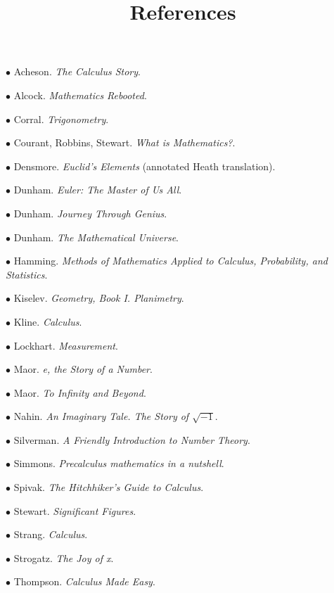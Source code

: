 \documentclass[11pt, oneside]{article}   	%
\title{References}
\date{}
\begin{document}
\maketitle
\Large

$\bullet$ Acheson.  \emph{The Calculus Story}.

$\bullet$ Alcock. \emph{Mathematics Rebooted}.

$\bullet$ Corral. \emph{Trigonometry}.

$\bullet$ Courant, Robbins, Stewart. \emph{What is Mathematics?}.

$\bullet$ Densmore. \emph{Euclid's Elements} (annotated Heath translation).

$\bullet$ Dunham. \emph{Euler:  The Master of Us All}.

$\bullet$ Dunham. \emph{Journey Through Genius}.

$\bullet$ Dunham. \emph{The Mathematical Universe}.

$\bullet$ Hamming.  \emph{Methods of Mathematics Applied to Calculus, Probability, and Statistics}.

$\bullet$ Kiselev. \emph{Geometry, Book I. Planimetry}.

$\bullet$ Kline. \emph{Calculus}.

$\bullet$ Lockhart. \emph{Measurement}.

$\bullet$ Maor. \emph{e, the Story of a Number}.

$\bullet$ Maor. \emph{To Infinity and Beyond}.

$\bullet$ Nahin. \emph{An Imaginary Tale.  The Story of $\sqrt{-1}$}.

$\bullet$ Silverman.  \emph{A Friendly Introduction to Number Theory}.

$\bullet$ Simmons.  \emph{Precalculus mathematics in a nutshell}.

$\bullet$ Spivak.  \emph{The Hitchhiker's Guide to Calculus}.

$\bullet$ Stewart.  \emph{Significant Figures}.

$\bullet$ Strang.  \emph{Calculus}.

$\bullet$ Strogatz.  \emph{The Joy of x}.

$\bullet$ Thompson.  \emph{Calculus Made Easy}.
\end{document}
